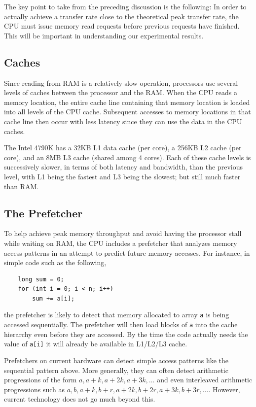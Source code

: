 \documentclass{patmorin}
\begin{document}
The key point to take from the preceding discussion is the following: In
order to actually achieve a transfer rate close to the theoretical peak
transfer rate, the CPU must issue memory read requests before previous
requests have finished.  This will be important in understanding our
experimental results.

\subsection{Caches}

Since reading from RAM is a relatively slow operation, processors use
several levels of caches between the processor and the RAM.  When the
CPU reads a memory location, the entire cache line containing that memory
location is loaded into all levels of the CPU cache.  Subsequent accesses
to memory locations in that cache line then occur with less latency
since they can use the data in the CPU caches.

The Intel 4790K has a 32KB L1 data cache (per core), a 256KB L2 cache (per
core), and an 8MB L3 cache (shared among 4 cores).  Each of these cache
levels is successively slower, in terms of both latency and bandwidth,
than the previous level, with L1 being the fastest and L3 being the slowest;
but still much faster than RAM.

\subsection{The Prefetcher}

To help achieve peak memory throughput and avoid having the processor
stall while waiting on RAM, the CPU includes a prefetcher that analyzes
memory access patterns in an attempt to predict future memory accesses.
For instance, in simple code such as the following,
\begin{verbatim}
    long sum = 0;
    for (int i = 0; i < n; i++) 
        sum += a[i];
\end{verbatim}
the prefetcher is likely to detect that memory allocated to array
\texttt{a} is being accessed sequentially.  The prefetcher will
then load blocks of \texttt{a} into the cache hierarchy even
before they are accessed.  By the time the code actually needs the value
of \texttt{a[i]} it will already be available in L1/L2/L3 cache.

Prefetchers on current hardware can detect simple access patterns
like the sequential pattern above.  More generally, they can often
detect arithmetic progressions of the form $a,a+k,a+2k,a+3k,\ldots$
and even interleaved arithmetic progressions such as $a, b, a+k, b+r,
a+2k,b+2r,a+3k,b+3r,\ldots$.  However, current technology does not go
much beyond this.
\end{document}
